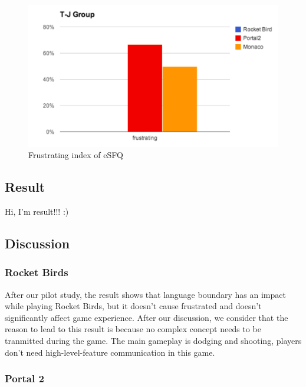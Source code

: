 \begin{figure}[!h]
\centering
\includegraphics[width=0.9\columnwidth]{Figures/PS_F1.png}
\caption{Frustrating index of eSFQ}
\label{fig:figure1}
\end{figure}


\subsection{Result}

Hi, I'm result!!! :)


\subsection{Discussion}
\subsubsection{Rocket Birds}

After our pilot study, the result shows that language boundary has an impact while playing Rocket Birds, but it doesn't cause frustrated and doesn't significantly affect game experience. After our discussion, we consider that the reason to lead to this result is because no complex concept needs to be tranmitted during the game. The main gameplay is dodging and shooting, players don't need high-level-feature communication in this game.


\subsubsection{Portal 2}


